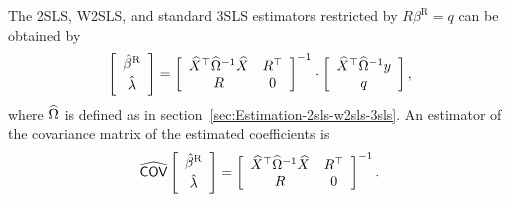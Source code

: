 The 2SLS, W2SLS, and standard 3SLS estimators
restricted by $R \beta^\text{R} = q$ can be obtained by
\begin{equation}
   \left[ \begin{array}{c}
      \hat{\beta}^\text{R} \\[0.2em] \hat{\lambda}
   \end{array} \right]
   =
   \left[ \begin{array}{cc}
      \widehat{X}^\top \widehat{\Omega}^{-1} \widehat{X} & R^\top \\
      R & 0
   \end{array} \right]^{-1}
   \cdot
   \left[ \begin{array}{c}
      \widehat{X}^\top \widehat{\Omega}^{-1} y \\ q
   \end{array} \right] ,
   \label{eq:2sls-w2sls-3sls-r}
\end{equation}
where $\widehat{\Omega}$ is defined as in section~\ref{sec:Estimation-2sls-w2sls-3sls}.
An estimator of the covariance matrix of the estimated coefficients is
\begin{equation}
   \widehat{\mathsf{COV}}
   \left[ \begin{array}{c}
      \hat{\beta}^\text{R} \\[0.2em] \hat{\lambda}
   \end{array} \right] 
   = 
   \left[ \begin{array}{cc}
      \widehat{X}^\top \widehat{\Omega}^{-1} \widehat{X} & R^\top \\
      R & 0
   \end{array} \right]^{-1} .
   \label{eq:cov-2sls-w2sls-3sls-r}
\end{equation}

